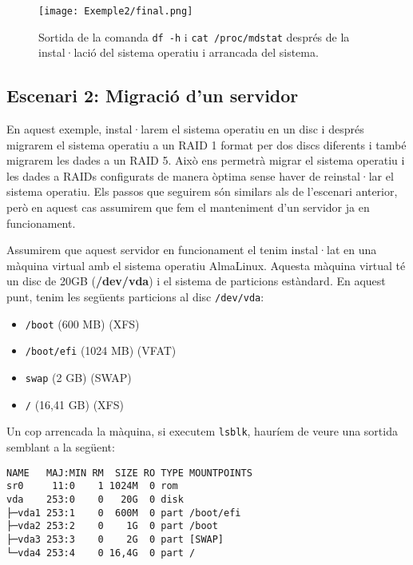 \begin{figure}
        \centering
        \texttt{[image: Exemple2/final.png]}
        \caption{Sortida de la comanda \texttt{df -h} i \texttt{cat /proc/mdstat} després de la instal·lació del sistema operatiu i arrancada del sistema.}
        \label{fig:ex2_final}
\end{figure}


\subsection{Escenari 2: Migració d'un servidor}\label{escenari-1-instal·lació-del-sistema-operatiu}

En aquest exemple, instal·larem el sistema operatiu en un disc i després migrarem el sistema operatiu a un RAID 1 format per dos discs diferents i també migrarem les dades a un RAID 5. Això ens permetrà migrar el sistema operatiu i les dades a RAIDs configurats de manera òptima sense haver de reinstal·lar el sistema operatiu. Els passos que seguirem són similars als de l'escenari anterior, però en aquest cas assumirem que fem el manteniment d'un servidor ja en funcionament.

Assumirem que aquest servidor en funcionament el tenim instal·lat en una màquina virtual amb el sistema operatiu AlmaLinux. Aquesta màquina virtual té un disc de 20GB (\textbf{/dev/vda}) i el sistema de particions estàndard. En aquest punt, tenim les següents particions al disc \texttt{/dev/vda}:

\begin{itemize}
        \item \texttt{/boot} (600 MB) (XFS)
        \item \texttt{/boot/efi} (1024 MB) (VFAT)
        \item \texttt{swap} (2 GB) (SWAP)
        \item \texttt{/} (16,41 GB) (XFS)
\end{itemize}
Un cop arrencada la màquina, si executem \texttt{lsblk}, hauríem de veure una sortida semblant a la següent:

\begin{terminaloutput}
\footnotesize\begin{verbatim}
NAME   MAJ:MIN RM  SIZE RO TYPE MOUNTPOINTS
sr0     11:0    1 1024M  0 rom
vda    253:0    0   20G  0 disk
├─vda1 253:1    0  600M  0 part /boot/efi
├─vda2 253:2    0    1G  0 part /boot
├─vda3 253:3    0    2G  0 part [SWAP]
└─vda4 253:4    0 16,4G  0 part /
\end{verbatim}
\end{terminaloutput}

